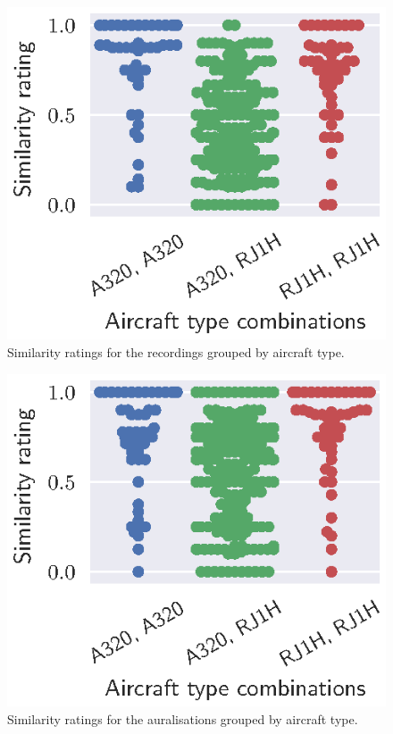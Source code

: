 \begin{figure}[H]
  \centering
  \includegraphics[]{../figures/manual/auralisation-paper/figure1_ratings_recordings}
  \caption{Similarity ratings for the recordings grouped by aircraft type.}
  \label{fig:ratings_recordings}
\end{figure}

\begin{figure}[H]
  \centering
  \includegraphics[]{../figures/manual/auralisation-paper/figure2_ratings_simulations}
  \caption{Similarity ratings for the auralisations grouped by aircraft type.}
  \label{fig:ratings_simulations}
\end{figure}

